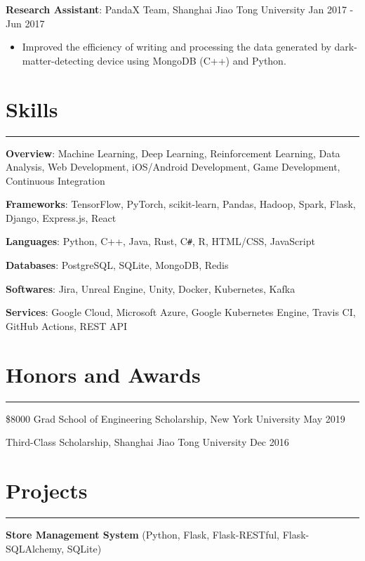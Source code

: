 \documentclass{article}
\begin{document}
\vspace{1em}

\textbf{Research Assistant}: PandaX Team, Shanghai Jiao Tong University \hfill
Jan 2017 - Jun 2017

\begin{itemize}[nosep]
	\item Improved the efficiency of writing and processing the data generated by dark-matter-detecting device using
	MongoDB (C++) and Python.
\end{itemize}

\section{Skills}
\hrule
\vspace{1em}

\textbf{Overview}: Machine Learning, Deep Learning, Reinforcement Learning, Data Analysis, Web Development,
iOS/Android Development, Game Development, Continuous Integration

\textbf{Frameworks}: TensorFlow, PyTorch, scikit-learn, Pandas, Hadoop, Spark, Flask, Django, Express.js, React

\textbf{Languages}: Python, C++, Java, Rust, C\texttt{\#}, R, HTML/CSS, JavaScript

\textbf{Databases}: PostgreSQL, SQLite, MongoDB, Redis

\textbf{Softwares}: Jira, Unreal Engine, Unity, Docker, Kubernetes, Kafka

\textbf{Services}: Google Cloud, Microsoft Azure, Google Kubernetes Engine, Travis CI, GitHub Actions, REST API

\section{Honors and Awards}
\hrule
\vspace{1em}

\$8000 Grad School of Engineering Scholarship, New York University \hfill
May 2019

Third-Class Scholarship, Shanghai Jiao Tong University \hfill
Dec 2016

\section{Projects}
\hrule
\vspace{1em}

\textbf{Store Management System} (Python, Flask, Flask-RESTful, Flask-SQLAlchemy, SQLite)
\end{document}
